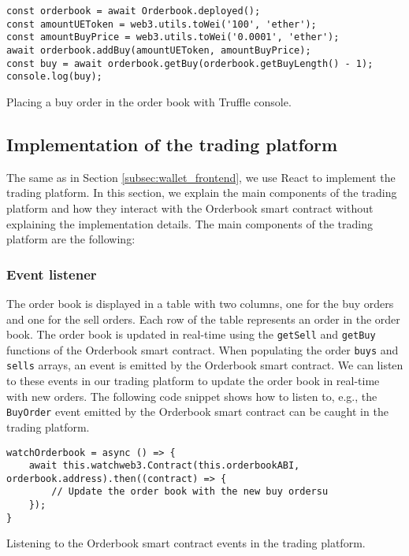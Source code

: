 \begin{listing}[H]
    \begin{verbatim}
const orderbook = await Orderbook.deployed();
const amountUEToken = web3.utils.toWei('100', 'ether');
const amountBuyPrice = web3.utils.toWei('0.0001', 'ether');
await orderbook.addBuy(amountUEToken, amountBuyPrice);
const buy = await orderbook.getBuy(orderbook.getBuyLength() - 1);
console.log(buy);
        \end{verbatim}
    \caption{Placing a buy order in the order book with Truffle console.}
    \label{lst:orderbook_buy}
\end{listing}


\subsection{Implementation of the trading platform}


The same as in  Section \ref{subsec:wallet_frontend}, we use React to implement the trading platform. In this section, we explain the main components of the trading
platform and how they interact with the Orderbook smart contract without explaining the implementation details. The main components of the trading platform are
the following:


\subsubsection{Event listener}


The order book is displayed in a table with two columns, one for the buy orders and one for the sell orders. Each row of the table represents an order in the order book.
The order book is updated in real-time using the \texttt{getSell} and \texttt{getBuy} functions of the Orderbook smart contract. When populating the order \texttt{buys} and
\texttt{sells} arrays, an event is emitted by the Orderbook smart contract. We can listen to these events in our trading platform to update the order book in real-time with
new orders. The following code snippet shows how to listen to, e.g., the \texttt{BuyOrder} event emitted by the Orderbook smart contract can be caught in the trading platform.

\begin{listing}[H]
    \begin{verbatim}
watchOrderbook = async () => {
    await this.watchweb3.Contract(this.orderbookABI, orderbook.address).then((contract) => {
        // Update the order book with the new buy ordersu
    });
}
    \end{verbatim}
    \caption{Listening to the Orderbook smart contract events in the trading platform.}
    \label{lst:watch_orderbook}
\end{listing}

